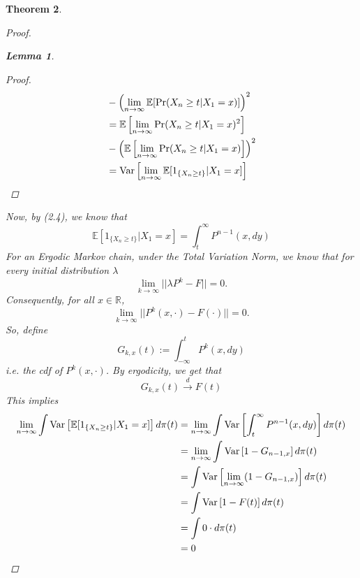 \documentclass{article}
\newtheorem{theorem}{Theorem}[section]
\newtheorem{lemma}[theorem]{Lemma}
\begin{document}
\begin{theorem}
\begin{proof}
\begin{lemma}
\begin{proof}
\begin{align*}
						&- \left(\lim_{n \rightarrow \infty} \mathbb{E}[\Pr(X_{n} \geq t | X_{1} = x)]\right)^2\\
						&= \mathbb{E}\left[\lim_{n \rightarrow \infty} \Pr(X_{n} \geq t | X_{1} = x)^2\right]\\
						&- \left(\mathbb{E}\left[\lim_{n \rightarrow \infty}\Pr(X_{n} \geq t | X_{1} = x)\right]\right)^2\\
						&= \text{Var}\left[\lim_{n \rightarrow \infty} \mathbb{E}[1_{\{X_{n} \geq t\}}|X_1=x]\right]
					\end{align*}
				\end{proof}
			\end{lemma}
			Now, by (2.4), we know that
			\begin{equation*}
				\mathbb{E}[1_{\{X_{n} \geq t\}}|X_1=x] = \int_t^{\infty} P^{n-1}(x, dy)
			\end{equation*}
			For an Ergodic Markov chain, under the Total Variation Norm, we know that for every initial distribution $\lambda$
			\begin{equation*}
				\lim_{k\rightarrow\infty}||\lambda P^k - F|| = 0.
			\end{equation*}
			Consequently, for all $x \in \mathbb{R}$,
			\begin{equation*}
				\lim_{k\rightarrow\infty}||P^k(x, \cdot) - F(\cdot)|| = 0.
			\end{equation*}
			So, define $$G_{k, x}(t) := \int_{-\infty}^{t} P^{k}(x, dy)$$
			i.e. the cdf of $P^k(x, \cdot)$. By ergodicity, we get that
			$$G_{k, x}(t) \xrightarrow{d} F(t)$$
			This implies
			\begin{align*}
				\lim_{n \rightarrow \infty} \int \text{Var}\left[\mathbb{E}[1_{\{X_{n} \geq t\}}|X_1=x]\right] d\pi(t) &= \lim_{n \rightarrow \infty} \int \text{Var}\left[\int_t^{\infty} P^{n-1}(x, dy)\right] d\pi(t)\\
				&= \lim_{n \rightarrow \infty} \int \text{Var}\left[1-G_{n-1, x}\right] d\pi(t)\\
				&= \int \text{Var}\left[\lim_{n \rightarrow \infty}(1-G_{n-1, x})\right] d\pi(t)\\
				&= \int \text{Var}\left[1-F(t)\right] d\pi(t)\\
				&= \int 0 \cdot d\pi(t)\\
				&= 0
			\end{align*}
		\end{proof}
	\end{theorem}
\end{document}
